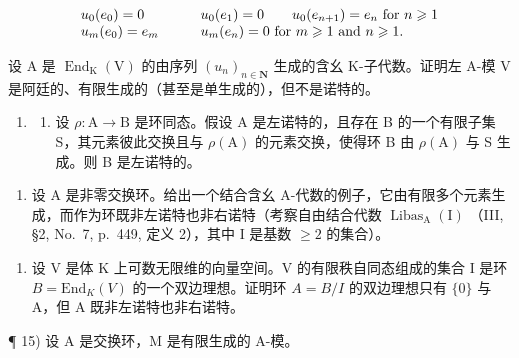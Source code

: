 \[
\begin{array}{l l} u _ {0} (e _ {0}) = 0 & \qquad u _ {0} (e _ {1}) = 0 \qquad u _ {0} (e _ {n + 1}) = e _ {n} \text { for } n \geqslant 1 \\ u _ {m} (e _ {0}) = e _ {m} & \qquad u _ {m} (e _ {n}) = 0 \text { for } m \geqslant 1 \text { and } n \geqslant 1. \end{array}
\]

设 \(\mathrm{A}\) 是 \(\operatorname{End}_{\mathrm{K}}(\mathrm{V})\) 的由序列 \((u_n)_{n \in \mathbf{N}}\) 生成的含幺 K-子代数。证明左 A-模 \(\mathrm{V}\) 是阿廷的、有限生成的（甚至是单生成的），但不是诺特的。

\begin{enumerate}
\def\labelenumi{\arabic{enumi})}
\setcounter{enumi}{12}
\tightlist
\item
  \begin{enumerate}
  \def\labelenumii{\alph{enumii})}
  \tightlist
  \item
    设 \(\rho: \mathrm{A} \to \mathrm{B}\) 是环同态。假设 A 是左诺特的，且存在 B 的一个有限子集 S，其元素彼此交换且与 \(\rho(\mathrm{A})\) 的元素交换，使得环 B 由 \(\rho(\mathrm{A})\) 与 S 生成。则 B 是左诺特的。
  \end{enumerate}
\end{enumerate}

\begin{enumerate}
\def\labelenumi{\alph{enumi})}
\setcounter{enumi}{1}
\tightlist
\item
  设 A 是非零交换环。给出一个结合含幺 A-代数的例子，它由有限多个元素生成，而作为环既非左诺特也非右诺特（考察自由结合代数 \(\operatorname{Libas}_{\mathrm{A}}(\mathrm{I})\) （III, §2, No.~7, p.~449, 定义 2），其中 I 是基数 \(\geqslant 2\) 的集合）。
\end{enumerate}

\begin{enumerate}
\def\labelenumi{\arabic{enumi})}
\setcounter{enumi}{13}
\tightlist
\item
  设 V 是体 K 上可数无限维的向量空间。V 的有限秩自同态组成的集合 I 是环 \(B = \text{End}_{K}(V)\) 的一个双边理想。证明环 \(A = B/I\) 的双边理想只有 \(\{0\}\) 与 A，但 A 既非左诺特也非右诺特。
\end{enumerate}

¶ 15) 设 A 是交换环，M 是有限生成的 A-模。

